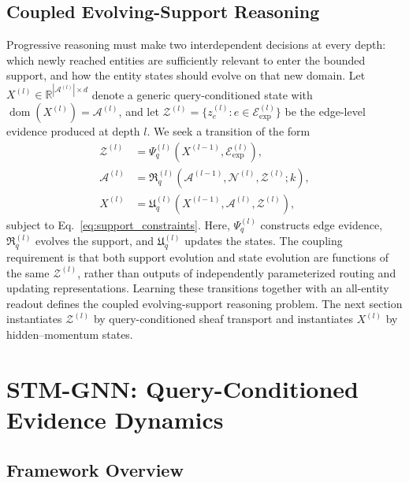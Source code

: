 \documentclass[a4paper,fleqn]{cas-sc}
\begin{document}
\subsection{Coupled Evolving-Support Reasoning}\label{subsec:coupled_problem}

Progressive reasoning must make two interdependent decisions at every depth:
which newly reached entities are sufficiently relevant to enter the bounded
support, and how the entity states should evolve on that new domain. Let
$X^{(l)}\in\mathbb{R}^{|\mathcal{A}^{(l)}|\times d}$ denote a generic
query-conditioned state with
$\operatorname{dom}(X^{(l)})=\mathcal{A}^{(l)}$, and let
$\mathcal{Z}^{(l)}=\{z_e^{(l)}:e\in
\mathcal{E}_{\mathrm{exp}}^{(l)}\}$ be the edge-level evidence produced at
depth $l$. We seek a transition of the form
\begin{equation}
\begin{aligned}
\mathcal{Z}^{(l)}
&=\Psi_q^{(l)}
\left(X^{(l-1)},\mathcal{E}_{\mathrm{exp}}^{(l)}\right),\\
\mathcal{A}^{(l)}
&=\mathfrak{R}_q^{(l)}
\left(\mathcal{A}^{(l-1)},\mathcal{N}^{(l)},
\mathcal{Z}^{(l)};k\right),\\
X^{(l)}
&=\mathfrak{U}_q^{(l)}
\left(X^{(l-1)},\mathcal{A}^{(l)},\mathcal{Z}^{(l)}\right),
\end{aligned}
\label{eq:coupled_transition_problem}
\end{equation}
subject to Eq.~\eqref{eq:support_constraints}. Here, $\Psi_q^{(l)}$ constructs
edge evidence, $\mathfrak{R}_q^{(l)}$ evolves the support, and
$\mathfrak{U}_q^{(l)}$ updates the states. The coupling requirement is that both
support evolution and state evolution are functions of the same
$\mathcal{Z}^{(l)}$, rather than outputs of independently parameterized routing
and updating representations. Learning these transitions together with an
all-entity readout defines the coupled evolving-support reasoning problem. The
next section instantiates $\mathcal{Z}^{(l)}$ by query-conditioned sheaf
transport and instantiates $X^{(l)}$ by hidden--momentum states.

\section{STM-GNN: Query-Conditioned Evidence Dynamics}\label{sec:proposed_model}

\subsection{Framework Overview}\label{subsec:stm_overview}
\end{document}

